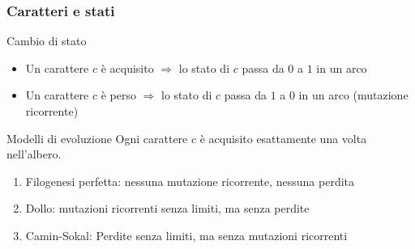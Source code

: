 






\begin{frame}
\frametitle{Caratteri e stati}

\begin{block}{Cambio di stato}
  \begin{itemize}
\item  Un carattere $c$ è  \alert{acquisito} $\Rightarrow$ lo stato di  $c$ passa da  $0$ a $1$
  in un arco
  \item  Un carattere $c$ è \alert{perso} $\Rightarrow$   lo stato di  $c$ passa da  $1$ a $0$
  in un arco (\alert{mutazione ricorrente})
\end{itemize}
\end{block}

\begin{block}{Modelli di evoluzione}
Ogni carattere $c$ è  acquisito \alert{esattamente una volta} nell'albero.
\begin{enumerate}
\item
  Filogenesi perfetta: nessuna mutazione ricorrente, nessuna perdita
\item
  \alert{Dollo}:
  mutazioni ricorrenti senza limiti, ma senza perdite
\item
  \alert{Camin-Sokal}:
  Perdite senza limiti, ma senza mutazioni ricorrenti
\end{enumerate}
\end{block}
\end{frame}



